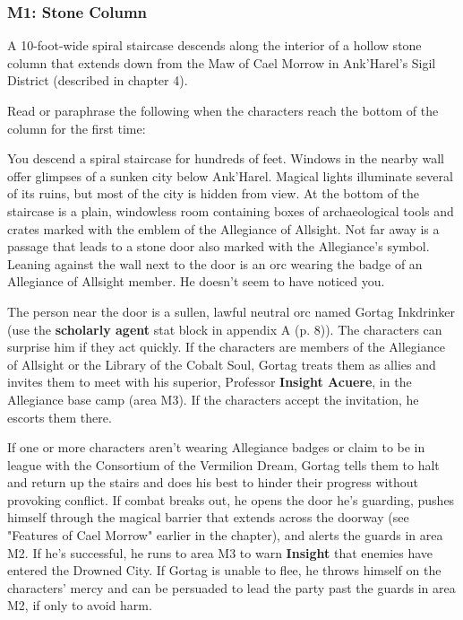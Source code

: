 \documentclass[letterpaper, 11pt, bg=full, twocolumn]{dndbook}
\begin{document}
\subsubsection{M1: Stone Column}

A 10-foot-wide spiral staircase descends along the interior of a hollow stone column that extends down from the Maw of Cael Morrow in Ank'Harel's Sigil District (described in chapter 4).

Read or paraphrase the following when the characters reach the bottom of the column for the first time:

\begin{DndReadAloud}
You descend a spiral staircase for hundreds of feet. Windows in the nearby wall offer glimpses of a sunken city below Ank'Harel. Magical lights illuminate several of its ruins, but most of the city is hidden from view.
At the bottom of the staircase is a plain, windowless room containing boxes of archaeological tools and crates marked with the emblem of the Allegiance of Allsight. Not far away is a passage that leads to a stone door also marked with the Allegiance's symbol. Leaning against the wall next to the door is an orc wearing the badge of an Allegiance of Allsight member. He doesn't seem to have noticed you.
\end{DndReadAloud}

The person near the door is a sullen, lawful neutral orc named Gortag Inkdrinker (use the \textbf{scholarly agent} stat block in appendix A (p. 8)). The characters can surprise him if they act quickly. If the characters are members of the Allegiance of Allsight or the Library of the Cobalt Soul, Gortag treats them as allies and invites them to meet with his superior, Professor \textbf{Insight Acuere}, in the Allegiance base camp (area M3). If the characters accept the invitation, he escorts them there.

If one or more characters aren't wearing Allegiance badges or claim to be in league with the Consortium of the Vermilion Dream, Gortag tells them to halt and return up the stairs and does his best to hinder their progress without provoking conflict. If combat breaks out, he opens the door he's guarding, pushes himself through the magical barrier that extends across the doorway (see "Features of Cael Morrow" earlier in the chapter), and alerts the guards in area M2. If he's successful, he runs to area M3 to warn \textbf{Insight} that enemies have entered the Drowned City. If Gortag is unable to flee, he throws himself on the characters' mercy and can be persuaded to lead the party past the guards in area M2, if only to avoid harm.
\end{document}
